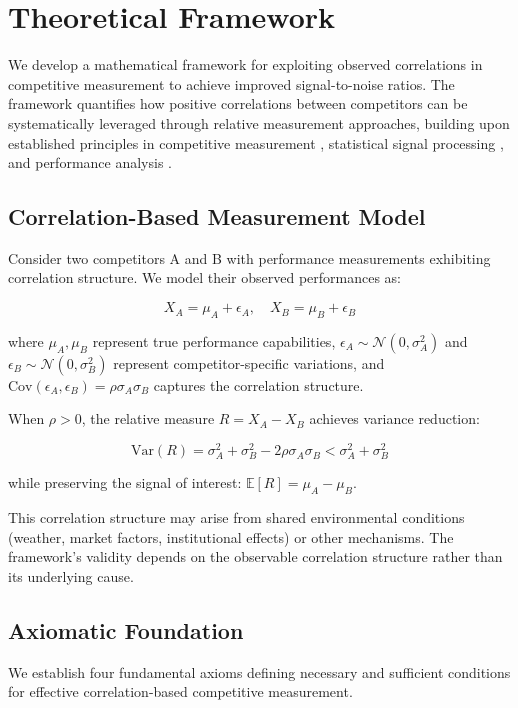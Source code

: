 \section{Theoretical Framework}

We develop a mathematical framework for exploiting observed correlations in competitive measurement to achieve improved signal-to-noise ratios. The framework quantifies how positive correlations between competitors can be systematically leveraged through relative measurement approaches, building upon established principles in competitive measurement \cite{keiningham2015competitive}, statistical signal processing \cite{boll1979suppression}, and performance analysis \cite{hughes2002performance}.

\subsection{Correlation-Based Measurement Model}

Consider two competitors A and B with performance measurements exhibiting correlation structure. We model their observed performances as:

$$X_A = \mu_A + \epsilon_A, \quad X_B = \mu_B + \epsilon_B$$

where $\mu_A, \mu_B$ represent true performance capabilities, $\epsilon_A \sim \mathcal{N}(0, \sigma_A^2)$ and $\epsilon_B \sim \mathcal{N}(0, \sigma_B^2)$ represent competitor-specific variations, and $\text{Cov}(\epsilon_A, \epsilon_B) = \rho\sigma_A\sigma_B$ captures the correlation structure.

When $\rho > 0$, the relative measure $R = X_A - X_B$ achieves variance reduction:

$$\text{Var}(R) = \sigma_A^2 + \sigma_B^2 - 2\rho\sigma_A\sigma_B < \sigma_A^2 + \sigma_B^2$$

while preserving the signal of interest: $\mathbb{E}[R] = \mu_A - \mu_B$.

This correlation structure may arise from shared environmental conditions (weather, market factors, institutional effects) or other mechanisms. The framework's validity depends on the observable correlation structure rather than its underlying cause.

\subsection{Axiomatic Foundation}

We establish four fundamental axioms defining necessary and sufficient conditions for effective correlation-based competitive measurement.

